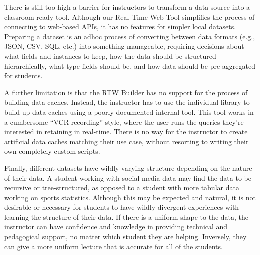     There is still too high a barrier for instructors to transform a data source into a classroom ready tool.
    Although our Real-Time Web Tool simplifies the process of connecting to web-based APIs, it has no features for simpler local datasets. 
   Preparing a dataset is an adhoc process of converting between data formats (e.g., JSON, CSV, SQL, etc.) into something manageable, requiring decisions about what fields and instances to keep, how the data should be structured hierarchically, what type fields should be, and how data should be pre-aggregated for students.
   
   A further limitation is that the RTW Builder has no support for the process of building data caches.
   Instead, the instructor has to use the individual library to build up data caches using a poorly documented internal tool.
   This tool works in a cumbersome ``VCR recording''-style, where the user runs the queries they're interested in retaining in real-time. 
   There is no way for the instructor to create artificial data caches matching their use case, without resorting to writing their own completely custom scripts.
    
    Finally, different datasets have wildly varying structure depending on the nature of their data.
    A student working with social media data may find the data to be recursive or tree-structured, as opposed to a student with more tabular data working on sports statistics.
    Although this may be expected and natural, it is not desirable or necessary for students to have wildly divergent experiences with learning the structure of their data. 
    If there is a uniform shape to the data, the instructor can have confidence and knowledge in providing technical and pedagogical support, no matter which student they are helping.
    Inversely, they can give a more uniform lecture that is accurate for all of the students.
    
